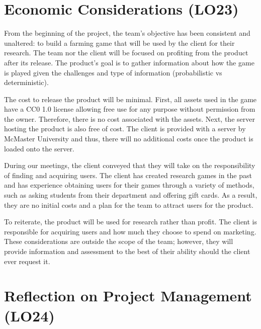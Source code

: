 \documentclass{article}
\begin{document}
\section{Economic Considerations (LO23)}


From the beginning of the project, the team's objective has been consistent and unaltered: to build a farming game that will be used by the client for their research. The team nor the client will be focused on profiting from the product after its release. The product's goal is to gather information about how the game is played given the challenges and type of information (probabilistic vs deterministic). 

The cost to release the product will be minimal. First, all assets used in the game have a CC0 1.0 license allowing free use for any purpose without permission from the owner. Therefore, there is no cost associated with the assets. Next, the server hosting the product is also free of cost. The client is provided with a server by McMaster University and thus, there will no additional costs once the product is loaded onto the server.

During our meetings, the client conveyed that they will take on the responsibility of finding and acquiring users. The client has created research games in the past and has experience obtaining users for their games through a variety of methods, such as asking students from their department and offering gift cards. As a result, they are no initial costs and a plan for the team to attract users for the product. 

To reiterate, the product will be used for research rather than profit. The client is responsible for acquiring users and how much they choose to spend on marketing. These considerations are outside the scope of the team; however, they will provide information and assessment to the best of their ability should the client ever request it.

\section{Reflection on Project Management (LO24)}
\end{document}
